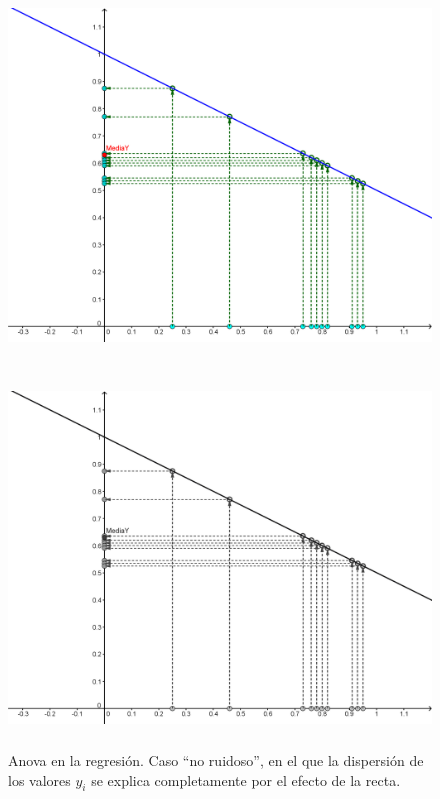 \begin{ejemplo}
\begin{figure}[p]
\begin{center}
\begin{enColor}
\includegraphics[height=10cm]{../fig/Cap10-Anova01.png}
\end{enColor}
\begin{bn}
\includegraphics[height=10cm]{../fig/Cap10-Anova01-bn.png}
\end{bn}
\caption{Anova en la regresión. Caso ``no ruidoso'',  en el que la dispersión de los valores $y_i$ se explica completamente por el efecto de la recta.}
\label{cap10:fig:Anova01}
\end{center}
\end{figure}


\end{ejemplo}
